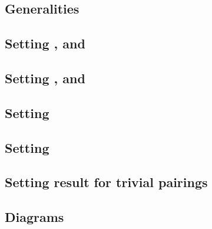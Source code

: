 \subsection{Generalities                                                                                 }    \label{bls: top level flags: generalities for malformed and wellformed}       %
\subsection{Setting \malformedDataInternalBit, \malformedDataInternalAcc{} and \malformedDataInternalTot }    \label{bls: top level flags: malformed internal bit acc justification}        %
\subsection{Setting \malformedDataExternalBit, \malformedDataExternalAcc{} and \malformedDataExternalTot }    \label{bls: top level flags: malformed external bit acc justification}        %
\subsection{Setting \nontrivialPairOfPointsBit{}                                                         }    \label{bls: top level flags: setting nontrivial pair of points bit}           %
\subsection{Setting \nontrivialPairOfPointsAcc{}                                                         }    \label{bls: top level flags: setting nontrivial pair of points acc}           %
\subsection{Setting result for trivial pairings                                                          }    \label{bls: top level flags: setting trivial result of pairings}              %
\subsection{Diagrams                                                                                     \lispNone{}}    \label{bls: top level flags: setting diagrams}                                
                
